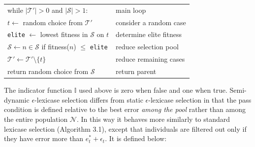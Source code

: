 \documentclass[twoside]{article}
\begin{document}
{\begin{tabularx}{\textwidth}{lX}
\hspace{1em}	while $|\mathcal{T}'| >0$ and $|\mathcal{S}|>1$:						&	main loop\\
\hspace{1em}\hspace{1em}	$t \leftarrow$ random choice from $\mathcal{T'}$  	&	\hspace{1em}consider a random case\\
\hspace{1em}\hspace{1em}	\texttt{elite} $\leftarrow$ lowest fitness in $\mathcal{S}$ on $t$ 	&	\hspace{1em}determine elite fitness\\
\hspace{1em}\hspace{1em}	$\mathcal{S} \leftarrow n \in \mathcal{S}$ if fitness($n$) $\leq$ \texttt{elite}	&	\hspace{1em}reduce selection pool\\
\hspace{1em}\hspace{1em}	$\mathcal{T'} \leftarrow \mathcal{T'} \setminus \{t\}$ 				&	\hspace{1em}reduce remaining cases\\
\hspace{1em} return random choice from $\mathcal{S}$															&	return parent  
\end{tabularx}
}
\medskip

The indicator function $\mathbb{I}$ used above is zero when false and one when true. Semi-dynamic $\epsilon$-lexicase selection differs from static $\epsilon$-lexicase selection in that the pass condition is defined relative to the best error {\it among the pool} rather than among the entire population $\mathcal{N}$. In this way it behaves more similarly to standard lexicase selection (Algorithm 3.1), except that individuals are filtered out only if they have error more than $e^*_t + \epsilon_t$. It is defined below:
\end{document}
